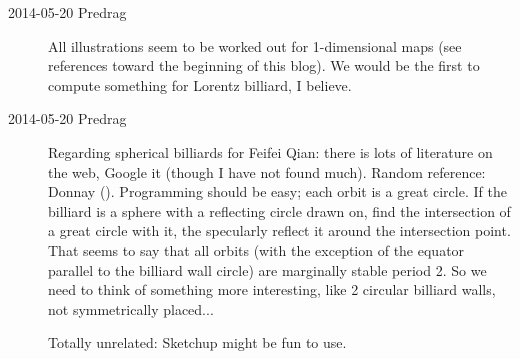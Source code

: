 \begin{description}
\item[2014-05-20 Predrag]
All illustrations seem to be worked out for 1-dimensional maps (see
references toward the beginning of this blog). We would be the first to
compute something for Lorentz billiard, I believe.

\item[2014-05-20 Predrag]
Regarding spherical billiards for Feifei Qian: there is lots of
literature on the web, Google it (though I have not found much). Random
reference: Donnay
().
Programming should be easy; each orbit is a great circle. If the billiard
is a sphere with a reflecting circle drawn on, find the intersection of a
great circle with it, the specularly reflect it around the intersection
point. That seems to say that all orbits (with the exception of the
equator parallel to the billiard wall circle) are marginally stable
period 2. So we need to think of something more interesting, like 2
circular billiard walls, not symmetrically placed...

Totally unrelated:
 {Sketchup}
might be fun to use.



\end{description}

